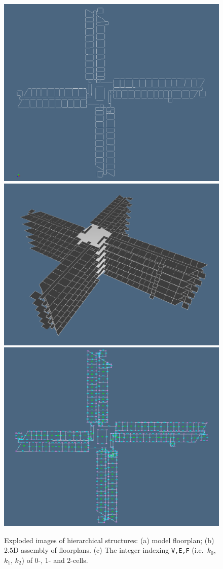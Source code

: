 \documentclass[]{egpubl}
\begin{document}
\begin{figure}[htbp] %
   \centering
   \includegraphics[width=0.469\linewidth]{images/input-png7} 
   \includegraphics[width=0.511\linewidth]{images/input-png12} 
   \includegraphics[width=\linewidth]{images/input-png5} 
   \caption{Exploded images of hierarchical structures: (a) model floorplan; (b) 2.5D assembly of floorplans. (c) The integer indexing \texttt{V,E,F} (i.e.~$k_0$, $k_1$, $k_2$) of 0-, 1- and 2-cells.}
   \label{fig:input-png0}
\end{figure}
\end{document}
